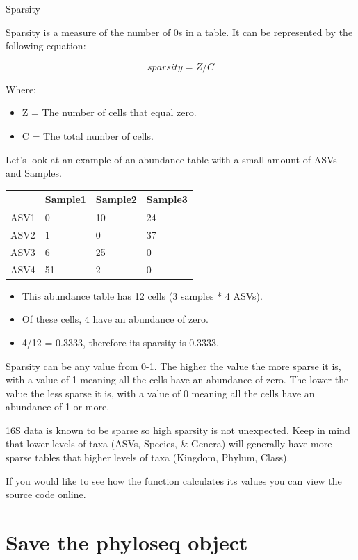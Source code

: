 \documentclass[
]{book}
\providecommand{\tightlist}{%
  \setlength{\itemsep}{0pt}\setlength{\parskip}{0pt}}
\begin{document}
Sparsity

Sparsity is a measure of the number of 0s in a table. It can be represented by the following equation:

\[
sparsity = Z/C
\]

Where:

\begin{itemize}
\tightlist
\item
  Z = The number of cells that equal zero.
\item
  C = The total number of cells.
\end{itemize}

Let's look at an example of an abundance table with a small amount of ASVs and Samples.

\begin{longtable}[]{@{}llll@{}}
\toprule\noalign{}
& Sample1 & Sample2 & Sample3 \\
\midrule\noalign{}
\endhead
\bottomrule\noalign{}
\endlastfoot
ASV1 & 0 & 10 & 24 \\
ASV2 & 1 & 0 & 37 \\
ASV3 & 6 & 25 & 0 \\
ASV4 & 51 & 2 & 0 \\
\end{longtable}

\begin{itemize}
\tightlist
\item
  This abundance table has 12 cells (3 samples * 4 ASVs).
\item
  Of these cells, 4 have an abundance of zero.
\item
  4/12 = 0.3333, therefore its sparsity is 0.3333.
\end{itemize}

Sparsity can be any value from 0-1. The higher the value the more sparse it is, with a value of 1 meaning all the cells have an abundance of zero. The lower the value the less sparse it is, with a value of 0 meaning all the cells have an abundance of 1 or more.

16S data is known to be sparse so high sparsity is not unexpected. Keep in mind that lower levels of taxa (ASVs, Species, \& Genera) will generally have more sparse tables that higher levels of taxa (Kingdom, Phylum, Class).

If you would like to see how the function calculates its values you can view the \href{https://rdrr.io/github/microbiome/microbiome/src/R/summarize_phyloseq.R}{source code online}.

\hypertarget{save-the-phyloseq-object}{%
\section{Save the phyloseq object}\label{save-the-phyloseq-object}}
\end{document}

